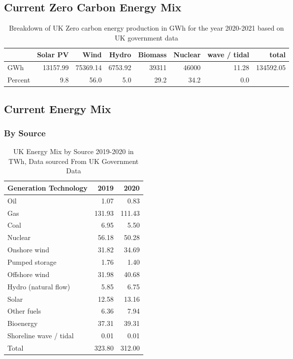 \documentclass[11pt]{article}
\numberwithin{equation}{section}
\begin{document}
\subsection{Current Zero Carbon Energy Mix}
\label{sec:org082e13b}
\begin{table}[H]
\caption{\label{tabUkGreenEnergy2020}Breakdown of UK Zero carbon energy production in GWh for the year 2020-2021 based on UK government data \cite{RenewableElecricityCap}}
\centering
\begin{tabular}{lrrrrrrr}
\toprule
 & Solar PV & Wind & Hydro & Biomass & Nuclear & wave / tidal & total\\
\midrule
GWh & 13157.99 & 75369.14 & 6753.92 & 39311 & 46000 & 11.28 & 134592.05\\
Percent & 9.8 & 56.0 & 5.0 & 29.2 & 34.2 & 0.0 & \\
\bottomrule
\end{tabular}
\end{table}

\subsection{Current Energy Mix \label{secAppCurrentEnergyMix}}
\label{sec:org6cdb6cd}
\subsubsection{By Source}
\label{sec:org6b694da}
\begin{table}[H]
\caption{\label{tabUKEnergyMix2019to20_byFuel}UK Energy Mix by Source 2019-2020 in TWh, Data sourced From UK Government Data\cite{ukEnergyConsumptionAll}}
\centering
\begin{tabular}{lrr}
\toprule
Generation Technology & 2019 & 2020\\
\midrule
Oil & 1.07 & 0.83\\
Gas & 131.93 & 111.43\\
Coal & 6.95 & 5.50\\
Nuclear & 56.18 & 50.28\\
Onshore wind & 31.82 & 34.69\\
Pumped storage & 1.76 & 1.40\\
Offshore wind & 31.98 & 40.68\\
Hydro (natural flow) & 5.85 & 6.75\\
Solar & 12.58 & 13.16\\
Other fuels & 6.36 & 7.94\\
Bioenergy & 37.31 & 39.31\\
Shoreline wave / tidal & 0.01 & 0.01\\
\midrule
Total & 323.80 & 312.00\\
\bottomrule
\end{tabular}
\end{table}
\end{document}
